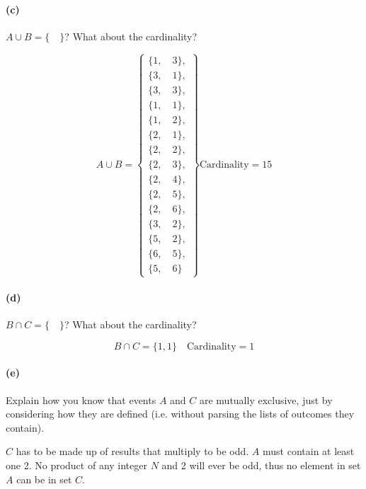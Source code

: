     \paragraph*{(c)}
    $A \cup B = \{\quad\}$? What about the cardinality?

    \begin{mdframed}
        \begin{equation}
            A \cup B =
            \left\{
                \begin{array}{l}
                    \{1, \quad 3\}, \\
                    \{3, \quad 1\}, \\
                    \{3, \quad 3\}, \\
                    \{1, \quad 1\}, \\
                    \{1, \quad 2\}, \\
                    \{2, \quad 1\}, \\
                    \{2, \quad 2\}, \\
                    \{2, \quad 3\}, \\
                    \{2, \quad 4\}, \\
                    \{2, \quad 5\}, \\
                    \{2, \quad 6\}, \\
                    \{3, \quad 2\}, \\
                    \{5, \quad 2\}, \\
                    \{6, \quad 5\}, \\
                    \{5, \quad 6\}
                \end{array}
            \right\}
            \text{Cardinality} = 15
        \end{equation}
    \end{mdframed}

    \paragraph*{(d)}
    $B \cap C = \{\quad\}$? What about the cardinality?
    
    \begin{mdframed}
        \begin{equation}
            B \cap C =\{1, 1\} \quad \text{Cardinality} = 1
        \end{equation}
    \end{mdframed}

    \paragraph*{(e)}
    Explain how you know that events $A$ and $C$ are mutually exclusive, just by considering how they are defined (i.e. without parsing the lists of outcomes they contain).
    
    \begin{mdframed}
        $C$ has to be made up of results that multiply to be odd. $A$ must contain at least one 2. No product of any integer $N$ and 2 will ever be odd, thus no element in set $A$ can be in set $C$.
    \end{mdframed}

